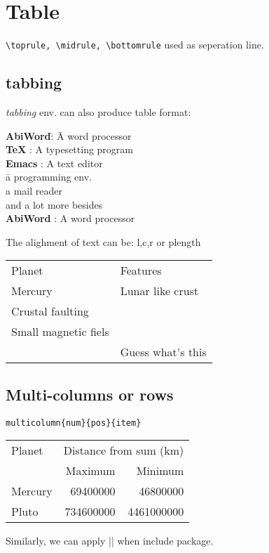 \section{Table}

\verb|\toprule, \midrule, \bottomrule| used as seperation line.

\subsection{tabbing}
\emph{tabbing} env. can also produce table format:
\begin{tabbing}
    \textbf{AbiWord}\quad\= : \= A word processor\kill \\
    \textbf{\TeX}\quad	 \> : \> A typesetting program \\[5pt]
    \textbf{Emacs}\quad	 \> : \> A text editor \\[5pt]
			 \>   \> \quad\= a programming env. \\[5pt]
			 \>   \>      \> a mail reader \\[5pt]
			 \>   \>      \> and a lot more besides \\[5pt]
    \textbf{AbiWord}\quad\> : \> A word processor
\end{tabbing}

The alighment of text can be: l,c,r or p{length}

\begin{center}
    \begin{tabular}{lp{6cm}}
	Planet	& Features\tabularnewline[8pt]
	Mercury	& \raggedright	Lunar like crust \\
				Crustal faulting \\
				Small magnetic fiels\tabularnewline[3pt]
		& Guess what's this \\
    \end{tabular}
\end{center}

\subsection{Multi-columns or rows}
\verb|multicolumn{num}{pos}{item}|
\begin{center}
    \begin{tabular}{|l|r|r|}
	\hline
	Planet	& \multicolumn{2}{c|}{Distance from sum (km)}\\
	\cline{2-3} 
		& Maximum   & Minimum   \\
	\hline
	Mercury	& 69400000  & 46800000	\\
	Pluto	& 734600000 & 4461000000    \\
	\hline
    \end{tabular}
\end{center}
Similarly, we can apply 
\command|| when include 
 package.

